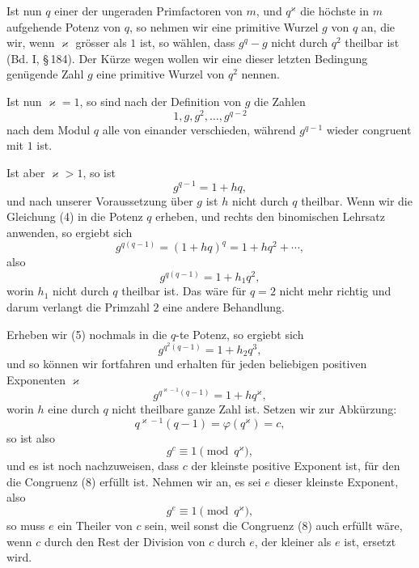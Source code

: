 \documentclass[11pt]{article}
\begin{document}
Ist nun $q$ einer der ungeraden Primfactoren von $m$, und $q^\varkappa$ die höchste in $m$ aufgehende Potenz von $q$, so nehmen wir eine primitive Wurzel $g$ von $q$ an, die wir, wenn $\varkappa$ grösser als $1$ ist, so wählen, dass $g^q-g$ nicht durch $q^2$ theilbar ist (Bd. I, \S\,184). Der Kürze wegen wollen wir eine dieser letzten Bedingung genügende Zahl $g$ eine primitive Wurzel von $q^2$ nennen.

Ist nun $\varkappa=1$, so sind nach der Definition von $g$ die Zahlen
\[
1,g,g^2,
\ldots,g^{q-2}
\]
nach dem Modul $q$ alle von einander verschieden, während $g^{q-1}$ wieder congruent mit $1$ ist.

Ist aber $\varkappa>1$, so ist
\begin{equation}
g^{q-1}=1+hq,
\tag{4}
\end{equation}
und nach unserer Voraussetzung über $g$ ist $h$ nicht durch $q$ theilbar. Wenn wir die Gleichung (4) in die Potenz $q$ erheben, und rechts den binomischen Lehrsatz anwenden, so ergiebt sich
\[
g^{q(q-1)}=(1+hq)^q=1+hq^2+\cdots,
\]
also
\begin{equation}
g^{q(q-1)}=1+h_1q^2,
\tag{5}
\end{equation}
worin $h_1$ nicht durch $q$ theilbar ist. Das wäre für $q=2$ nicht mehr richtig und darum verlangt die Primzahl $2$ eine andere Behandlung.

Erheben wir (5) nochmals in die $q$-te Potenz, so ergiebt sich
\[
g^{q^2(q-1)}=1+h_2q^3,
\]
und so können wir fortfahren und erhalten für jeden beliebigen positiven Exponenten $\varkappa$
\begin{equation}
g^{q^{\varkappa-1}(q-1)}=1+hq^\varkappa,
\tag{6}
\end{equation}
worin $h$ eine durch $q$ nicht theilbare ganze Zahl ist. Setzen wir zur Abkürzung:
\begin{equation}
q^{\varkappa-1}(q-1)=\varphi(q^\varkappa)=c,
\tag{7}
\end{equation}
so ist also
\begin{equation}
g^c\equiv1\pmod{q^\varkappa},
\tag{8}
\end{equation}
und es ist noch nachzuweisen, dass $c$ der kleinste positive Exponent ist, für den die Congruenz (8) erfüllt ist. Nehmen wir an, es sei $e$ dieser kleinste Exponent, also
\begin{equation}
g^e\equiv1\pmod{q^\varkappa},
\tag{9}
\end{equation}
so muss $e$ ein Theiler von $c$ sein, weil sonst die Congruenz (8) auch erfüllt wäre, wenn $c$ durch den Rest der Division von $c$ durch $e$, der kleiner als $e$ ist, ersetzt wird.
\end{document}
